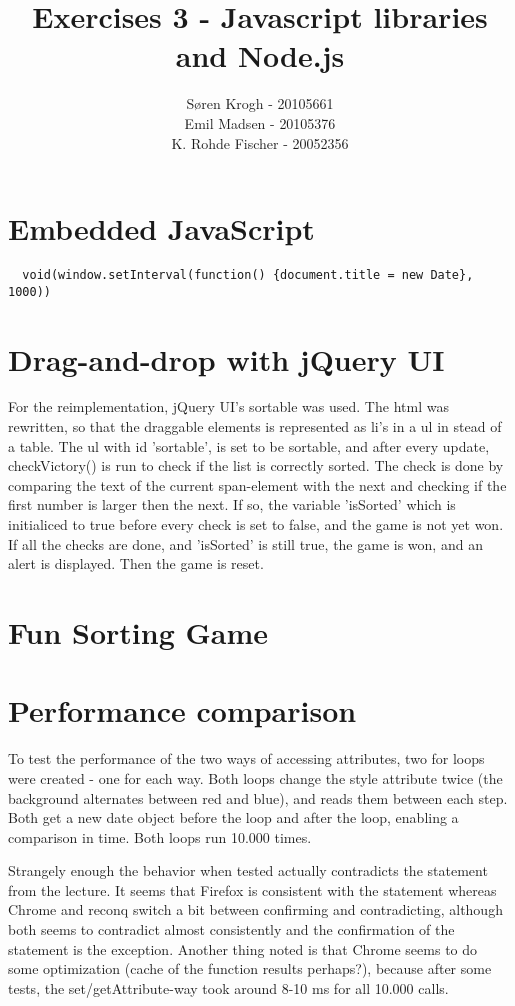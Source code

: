 \documentclass[a4paper,10pt]{article}
\author{
Søren Krogh -  20105661 \\
Emil Madsen - 20105376  \\
K. Rohde Fischer - 20052356\\}
\title{Exercises 3 - Javascript libraries and Node.js}
\begin{document}
\maketitle

\section*{Embedded JavaScript}

\begin{verbatim}
  void(window.setInterval(function() {document.title = new Date}, 1000))
\end{verbatim}


\section*{Drag-and-drop with jQuery UI}
For the reimplementation, jQuery UI's sortable was used.
The html was rewritten, so that the draggable elements is represented as li's in a ul in stead of a table.
The ul with id 'sortable', is set to be sortable, and after every update, checkVictory() is run to check if the list is correctly sorted.
The check is done by comparing the text of the current span-element with the next and checking if the first number is larger then the next. If so, the variable 'isSorted' which is initialiced to true before every check is set to false, and the game is not yet won.
If all the checks are done, and 'isSorted' is still true, the game is won, and an alert is displayed. Then the game is reset.


\section*{Fun Sorting Game}

\section*{Performance comparison}
To test the performance of the two ways of accessing attributes, two
for loops were created - one for each way.  Both loops change the
style attribute twice (the background alternates between red and
blue), and reads them between each step.  Both get a new date object
before the loop and after the loop, enabling a comparison in time.
Both loops run 10.000 times.

Strangely enough the behavior when tested actually contradicts the
statement from the lecture.  It seems that Firefox is consistent with
the statement whereas Chrome and reconq switch a bit between
confirming and contradicting, although both seems to contradict almost
consistently and the confirmation of the statement is the exception.
Another thing noted is that Chrome seems to do some optimization
(cache of the function results perhaps?), because after some tests,
the set/getAttribute-way took around 8-10 ms for all 10.000 calls.
\end{document}
